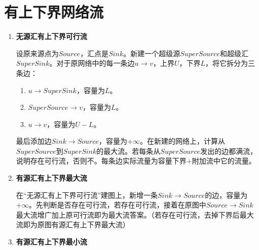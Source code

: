 \documentclass[11pt]{article}
\begin{document}
	\section{有上下界网络流}
	\begin{enumerate}[1.]
		\item \textbf{无源汇有上下界可行流}
			
			设原来源点为$Source$，汇点是$Sink$。新建一个超级源$SuperSource$和超级汇$SuperSink$。对于原网络中的每一条边$u \rightarrow v$，上界$U$，下界$L$，将它拆分为三条边：
			\begin{enumerate}[(1)]
				\item $u \rightarrow SuperSink$，容量为$L$。
				\item $SuperSource \rightarrow v$，容量为$L$。
				\item $u \rightarrow v$，容量为$U-L$。
			\end{enumerate}
			最后添加边$Sink \rightarrow Source$，容量为$+\infty$。在新建的网络上，计算从$SuperSource$到$SuperSink$的最大流。若每条从$SuperSource$发出的边都满流，说明存在可行流，否则不。每条边实际流量为容量下界$+$附加流中它的流量。
		\item \textbf{有源汇有上下界最大流}
		
			在``无源汇有上下界可行流''建图上，新增一条$Sink \rightarrow Source$的边，容量为$+\infty$。先判断是否存在可行流，若存在可行流，接着在原图中$Source \rightarrow Sink$最大流增广加上原可行流即为最大流答案。（若存在可行流，去掉下界后最大流即为原图有源汇有上下界最大流）
		\item \textbf{有源汇有上下界最小流}
			
	\end{enumerate}
\end{document}
